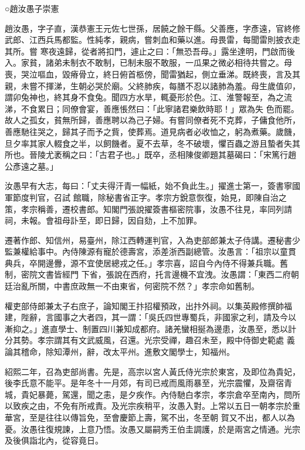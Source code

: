 
\begin{pinyinscope}

 ○趙汝愚子崇憲



 趙汝愚，字子直，漢恭憲王元佐七世孫，居饒之餘干縣。父善應，字彥遠，官終修武郎、江西兵馬都監。性純孝，親病，嘗刺血和藥以進。母畏雷，每聞雷則披衣走其所。嘗
 寒夜遠歸，從者將扣門，遽止之曰：「無恐吾母。」露坐達明，門啟而後入。家貧，諸弟未制衣不敢制，已制未服不敢服，一瓜果之微必相待共嘗之。母喪，哭泣嘔血，毀瘠骨立，終日俯首柩傍，聞雷猶起，側立垂涕。既終喪，言及其親，未嘗不揮涕，生朝必哭於廟。父終肺疾，每膳不忍以諸肺為羞。母生歲值卯，謂卯兔神也，終其身不食兔。聞四方水旱，輒憂形於色。江、淮警報至，為之流涕，不食累日；同僚會宴，善應悵然曰：「此寧諸君樂飲時耶！」眾為失
 色而罷。故人之孤女，貧無所歸，善應聘以為己子婦。有嘗同僚者死不克葬，子傭食他所，善應馳往哭之，歸其子而予之貲，使葬焉。道見病者必收恤之，躬為煮藥。歲饑，旦夕率其家人輟食之半，以飼饑者。夏不去草，冬不破壞，懼百蟲之游且蟄者失其所也。晉陵尤袤稱之曰：「古君子也。」既卒，丞相陳俊卿題其墓碣曰：「宋篤行趙公彥遠之墓。」



 汝愚早有大志，每曰：「丈夫得汗青一幅紙，始不負此生。」擢進士第一，簽書寧國軍節度判官，召試
 館職，除秘書省正字。孝宗方銳意恢復，始見，即陳自治之策，孝宗稱善，遷校書郎。知閣門張說擢簽書樞密院事，汝愚不往見，率同列請祠，未報。會祖母訃至，即日歸，因自劾，上不加罪。



 遷著作郎、知信州，易臺州，除江西轉運判官，入為吏部郎兼太子侍講。遷秘書少監兼權給事中。內侍陳源有寵於德壽宮，添差浙西副總管。汝愚言：「祖宗以童貫典兵，卒開邊釁，源不宜使居總戎之任。」孝宗喜，詔自今內侍不得兼兵職。舊制，密院文書皆經門
 下省，張說在西府，托言邊機不宜洩。汝愚謂：「東西二府朝廷治亂所關，中書庶政無一不由東省，何密院不然？」孝宗命如舊制。



 權吏部侍郎兼太子右庶子，論知閣王抃招權預政，出抃外祠。以集英殿修撰帥福建，陛辭，言國事之大者四，其一謂：「吳氏四世專蜀兵，非國家之利，請及今以漸抑之。」進直學士、制置四川兼知成都府。諸羌蠻相挻為邊患，汝愚至，悉以計分其勢。孝宗謂其有文武威風，召還。光宗受禪，趣召未至，殿中侍御史範處
 義論其稽命，除知潭州，辭，改太平州。進敷文閣學士，知福州。



 紹熙二年，召為吏部尚書。先是，高宗以宮人黃氏侍光宗於東宮，及即位為貴妃，後李氏意不能平。是年冬十一月郊，有司已戒而風雨暴至，光宗震懼，及齋宿青城，貴妃暴薨，駕還，聞之恚，是夕疾作。內侍馳白孝宗，孝宗倉卒至南內，問所以致疾之由，不免有所戒責。及光宗疾稍平，汝愚入對。上常以五日一朝孝宗於重華宮，至是往往以傳旨免，至會慶節上壽，駕不出，冬至朝
 賀又不出，都人以為憂。汝愚往復規諫，上意乃悟。汝愚又屬嗣秀王伯圭調護，於是兩宮之情通。光宗及後俱詣北內，從容竟日。




\end{pinyinscope}
